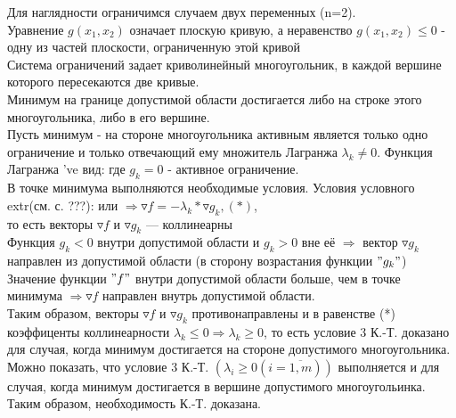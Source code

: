 Для наглядности ограничимся случаем двух переменных (n=2).\\
Уравнение $g(x_1,x_2)$ означает плоскую кривую, а неравенство $g(x_1,x_2) \leq  0$ - одну из частей плоскости, ограниченную этой кривой\\
Система ограничений 
задает криволинейный многоугольник, в каждой вершине которого пересекаются две кривые.\\
Минимум на границе допустимой области достигается либо на строке этого многоугольника, либо в его вершине.\\
Пусть минимум - на стороне многоугольника \Rightarrow активным является только одно ограничение и только отвечающий ему множитель Лагранжа $\lambda_k \neq 0$. Функция Лагранжа 've вид:
 где $g_k=0$ - активное ограничение.\\
В точке минимума выполняются необходимые условия.
Условия условного extr(см. с. ???):
 или 
$\Rightarrow \triangledown f = -\lambda_k * \triangledown g_k , (*)$, \\
то есть векторы $\triangledown f$ и $\triangledown g_k$ --- коллинеарны\\
Функция $g_k < 0$ внутри допустимой области и $g_k > 0$ вне её $\Rightarrow$ вектор $\triangledown g_k$ направлен из допустимой области (в сторону возрастания функции $"g_k"$)\\
Значение функции $"f"$ внутри допустимой области больше, чем в точке минимума $\Rightarrow \triangledown f$ направлен внутрь допустимой области. \\
Таким образом, векторы $\triangledown f$ и $\triangledown g_k$ противонаправлены и в равенстве (*) коэффиценты коллинеарности $\lambda_k \leq 0 \Rightarrow \lambda_k \geq 0 $, то есть условие 3 К.-Т. доказано для случая, когда минимум достигается на стороне допустимого многоугольника.\\
Можно показать, что условие 3 К.-Т. $(\lambda_i \geq 0 (i=\overline{1,m}))$ выполняется и для случая, когда минимум достигается в вершине допустимого многоугольинка.\\
Таким образом, необходимость К.-Т. доказана.

